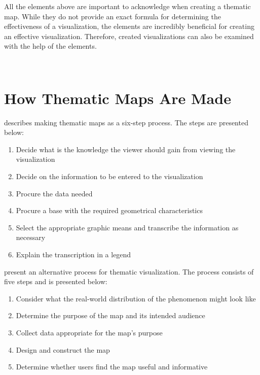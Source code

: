 All the elements above are important to acknowledge when creating a thematic map. While they do not provide an exact formula for determining the effectiveness of a visualization, the elements are incredibly beneficial for creating an effective visualization. Therefore, created visualizations can also be examined with the help of the elements.

~


\section{How Thematic Maps Are Made}
\label{section:thematicmaps}
\citet{schlichtmann_visualization_2002} describes making thematic maps as a six-step process. The steps are presented below:
\begin{enumerate}
	\item Decide what is the knowledge the viewer should gain from viewing the visualization
	\item Decide on the information to be entered to the visualization
	\item Procure the data needed
	\item Procure a base with the required geometrical characteristics
	\item Select the appropriate graphic means and transcribe the information as necessary
	\item Explain the transcription in a legend
\end{enumerate}

\citet[chap.~1]{slocum_thematic_2014} present an alternative process for thematic visualization. The process consists of five steps and is presented below:

\begin{enumerate}
	\item Consider what the real-world distribution of the phenomenon might look like
	\item Determine the purpose of the map and its intended audience
	\item Collect data appropriate for the map's purpose
	\item Design and construct the map
	\item Determine whether users find the map useful and informative
\end{enumerate}

